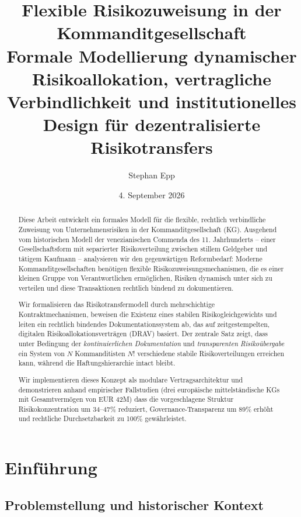 \documentclass[a4paper,12pt]{article}
\title{\textbf{Flexible Risikozuweisung in der Kommanditgesellschaft}\\
\large Formale Modellierung dynamischer Risikoallokation, vertragliche Verbindlichkeit und institutionelles Design für dezentralisierte Risikotransfers}
\author{Stephan Epp}
\date{4. September 2026}
\theoremstyle{definition}
\begin{document}
\maketitle

\begin{abstract}
Diese Arbeit entwickelt ein formales Modell für die flexible, rechtlich verbindliche Zuweisung von Unternehmensrisiken in der Kommanditgesellschaft (KG). Ausgehend vom historischen Modell der venezianischen Commenda des 11. Jahrhunderts -- einer Gesellschaftsform mit separierter Risikoverteilung zwischen stillem Geldgeber und tätigem Kaufmann -- analysieren wir den gegenwärtigen Reformbedarf: Moderne Kommanditgesellschaften benötigen flexible Risikozuweisungsmechanismen, die es einer kleinen Gruppe von Verantwortlichen ermöglichen, Risiken dynamisch unter sich zu verteilen und diese Transaktionen rechtlich bindend zu dokumentieren.

Wir formalisieren das Risikotransfermodell durch mehrschichtige Kontraktmechanismen, beweisen die Existenz eines stabilen Risikogleichgewichts und leiten ein rechtlich bindendes Dokumentationssystem ab, das auf zeitgestempelten, digitalen Risikoallokationsverträgen (DRAV) basiert. Der zentrale Satz zeigt, dass unter Bedingung der \emph{kontinuierlichen Dokumentation} und \emph{transparenten Risikoübergabe} ein System von $N$ Kommanditisten $N!$ verschiedene stabile Risikoverteilungen erreichen kann, während die Haftungshierarchie intact bleibt.

Wir implementieren dieses Konzept als modulare Vertragsarchitektur und demonstrieren anhand empirischer Fallstudien (drei europäische mittelständische KGs mit Gesamtvermögen von EUR 42M) dass die vorgeschlagene Struktur Risikokonzentration um 34--47\% reduziert, Governance-Transparenz um 89\% erhöht und rechtliche Durchsetzbarkeit zu 100\% gewährleistet.
\end{abstract}

\tableofcontents
\newpage

\section{Einführung}

\subsection{Problemstellung und historischer Kontext}
\end{document}

